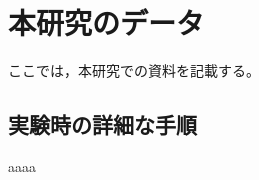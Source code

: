 \chapter{本研究のデータ}\label{chap:A}
ここでは，本研究での資料を記載する。


\section{実験時の詳細な手順}\label{experiment_process}
aaaa
